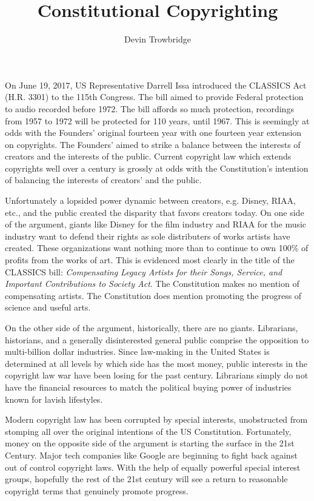 \documentclass[format=sigconf]{acmart}
\title{Constitutional Copyrighting}
\author{Devin Trowbridge}
\affiliation{%
  \department{Computer Science and Software Engineering}
  \institution{Auburn University}
  \email{dkt0003@auburn.edu}
  \city{Huntsville}
  \state{Alabama}
  \country{United States}
}
\begin{document}
\maketitle

On June 19, 2017, US Representative Darrell Issa introduced the CLASSICS Act (H.R. 3301) to the 115th Congress. The bill aimed to provide Federal protection to audio recorded before 1972. \cite{classics} The bill affords so much protection, recordings from 1957 to 1972 will be protected for 110 years, until 1967. \cite{eff} This is seemingly at odds with the Founders' original fourteen year with one fourteen year extension on copyrights. The Founders' aimed to strike a balance between the interests of creators and the interests of the public. Current copyright law which extends copyrights well over a century is grossly at odds with the Constitution's intention of balancing the interests of creators' and the public.

Unfortunately a lopsided power dynamic between creators, e.g. Disney, RIAA, etc., and the public created the disparity that favors creators today. On one side of the argument, giants like Disney for the film industry and RIAA for the music industry want to defend their rights as sole distributers of works artists have created. These organizations want nothing more than to continue to own 100\% of profits from the works of art. This is evidenced most clearly in the title of the CLASSICS bill: \textit{Compensating Legacy Artists for their Songs, Service, and Important Contributions to Society Act}. The Constitution makes no mention of compensating artists. The Constitution does mention promoting the progress of science and useful arts. 

On the other side of the argument, historically, there are no giants. Librarians, historians, and a generally disinterested general public comprise the opposition to multi-billion dollar industries. Since law-making in the United States is determined at all levels by which side has the most money, \cite{lobby} public interests in the copyright law war have been losing for the past century. Librarians simply do not have the financial resources to match the political buying power of industries known for lavish lifestyles.

Modern copyright law has been corrupted by special interests, unobstructed from stomping all over the original intentions of the US Constitution. Fortunately, money on the opposite side of the argument is starting the surface in the 21st Century. Major tech companies like Google are beginning to fight back against out of control copyright laws. \cite{google} With the help of equally powerful special interest groups, hopefully the rest of the 21st century will see a return to reasonable copyright terms that genuinely promote progress.

\medskip



\end{document}
